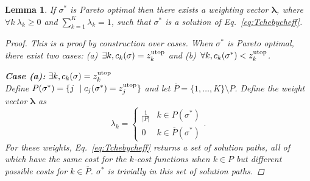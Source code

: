 \documentclass{article}
\newtheorem{lem}{Lemma}
\begin{document}
\begin{lem}
\label{lem:exist_weight}
If $ \sigma^{*} $ is Pareto optimal then there exists a weighting vector $ \bm{\lambda} $, where $ \forall k \ \lambda_k\geq 0$ and $\sum_{k=1}^{K} \lambda_{k} = 1 $, such that $ \sigma^{*} $ is a solution of Eq.~\eqref{eq:Tchebycheff}.
\begin{proof}
This is a proof by construction over cases.  
When $ \sigma^{*} $ is Pareto optimal, there exist two cases: (a)~$ \exists k ,  c_{k}( \sigma ) = z^{\rm utop}_{k} $ and (b)~$ \forall k,  c_{k}( \sigma^{*} ) < z^{\rm utop}_{k} $.

\textit{\textbf{Case (a):}} $ \exists k ,  c_{k}( \sigma ) = z^{\rm utop}_{k} $ \\
Define $ P(\sigma^*)=\{ j \ \mid  c_{j}(\sigma^*)=z_j^{\rm utop}\} $ and let $ \overline{P}=\{1,\ldots,K\} \setminus P $.
Define the weight vector $ \bm{\lambda} $ as 
\begin{equation}
  \lambda_k = \left\{
    \begin{array}{cc}
      \frac{1}{|P|} & k\in P(\sigma^*) \\
      0 & k\in\overline{P}(\sigma^*)
    \end{array}\right..
\end{equation}
For these weights, Eq.~\eqref{eq:Tchebycheff} returns a set of solution paths, all of which have the same cost for the $k$-cost functions when $k\in P$ but different possible costs for $k\in\overline{P}$.  $\sigma^*$ is trivially in this set of solution paths.


\end{proof}
\end{lem}
\end{document}
